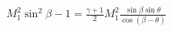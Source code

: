 \documentclass[10pt]{article}
\begin{document}
\begin{align*}M_{1}^{2} \sin^2 \beta - 1
=
\frac{\gamma+1}{2} M_{1}^{2} \frac{ \sin \beta \sin \theta}{\cos \left( \beta - \theta \right)}
\end{align*}
\end{document}
